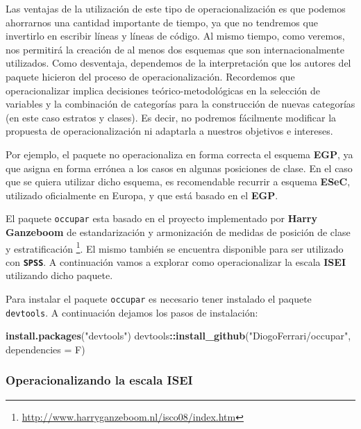 \documentclass[
]{article}
\newenvironment{Shaded}{\begin{snugshade}}{\end{snugshade}}
\newcommand{\AttributeTok}[1]{\textcolor[rgb]{0.13,0.29,0.53}{#1}}
\newcommand{\FunctionTok}[1]{\textcolor[rgb]{0.13,0.29,0.53}{\textbf{#1}}}
\newcommand{\NormalTok}[1]{#1}
\newcommand{\SpecialCharTok}[1]{\textcolor[rgb]{0.81,0.36,0.00}{\textbf{#1}}}
\newcommand{\StringTok}[1]{\textcolor[rgb]{0.31,0.60,0.02}{#1}}
\begin{document}
Las ventajas de la utilización de este tipo de operacionalización es que podemos ahorrarnos una cantidad importante de tiempo, ya que no tendremos que invertirlo en escribir líneas y líneas de código. Al mismo tiempo, como veremos, nos permitirá la creación de al menos dos esquemas que son internacionalmente utilizados. Como desventaja, dependemos de la interpretación que los autores del paquete hicieron del proceso de operacionalización. Recordemos que operacionalizar implica decisiones teórico-metodológicas en la selección de variables y la combinación de categorías para la construcción de nuevas categorías (en este caso estratos y clases). Es decir, no podremos fácilmente modificar la propuesta de operacionalización ni adaptarla a nuestros objetivos e intereses.

Por ejemplo, el paquete no operacionaliza en forma correcta el esquema \textbf{EGP}, ya que asigna en forma errónea a los casos en algunas posiciones de clase. En el caso que se quiera utilizar dicho esquema, es recomendable recurrir a esquema \textbf{ESeC}, utilizado oficialmente en Europa, y que está basado en el \textbf{EGP}.

El paquete \texttt{occupar} esta basado en el proyecto implementado por \textbf{Harry Ganzeboom} de estandarización y armonización de medidas de posición de clase y estratificación \footnote{\url{http://www.harryganzeboom.nl/isco08/index.htm}}. El mismo también se encuentra disponible para ser utilizado con \textbf{\texttt{SPSS}}. A continuación vamos a explorar como operacionalizar la escala \textbf{ISEI} utilizando dicho paquete.

Para instalar el paquete \texttt{occupar} es necesario tener instalado el paquete \texttt{devtools}. A continuación dejamos los pasos de instalación:

\begin{Shaded}
\begin{Highlighting}[]
\FunctionTok{install.packages}\NormalTok{(}\StringTok{"devtools"}\NormalTok{)}
\NormalTok{devtools}\SpecialCharTok{::}\FunctionTok{install\_github}\NormalTok{(}\StringTok{"DiogoFerrari/occupar"}\NormalTok{, }\AttributeTok{dependencies =}\NormalTok{ F)}
\end{Highlighting}
\end{Shaded}

\hypertarget{operacionalizando-la-escala-isei}{%
\subsubsection{Operacionalizando la escala ISEI}\label{operacionalizando-la-escala-isei}}
\end{document}
